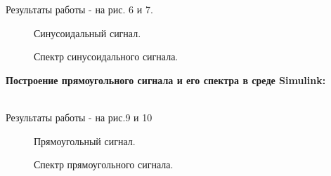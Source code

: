 \documentclass[12pt,a4paper]{scrartcl}
\begin{document}
Результаты работы - на рис. 6 и 7.
\begin{figure}[h!]
	\caption{Синусоидальный сигнал.}
\end{figure}
\begin{figure}[h!]
	\caption{Спектр синусоидального сигнала.}
\end{figure}
\newpage
\textbf{Построение прямоугольного сигнала и его спектра в среде Simulink:\\\\}

Результаты работы - на рис.9 и 10
\begin{figure}[h!]
	\caption{Прямоугольный сигнал.}
\end{figure}
\begin{figure}[h!]
	\caption{Спектр прямоугольного сигнала.}
\end{figure}
\end{document}
